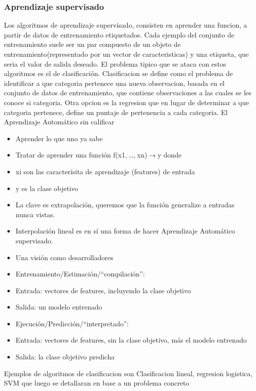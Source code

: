 \documentclass[a4paper,10pt]{article}
\begin{document}
    \subsubsection{Aprendizaje supervisado}
      Los algoritmos de aprendizaje supervisado, consisten en aprender una funcion, a partir de datos de entrenamiento etiquetados. Cada ejemplo del conjunto de entrenamiento suele ser un par
      compuesto de un objeto de entrenamiento(representado por un vector de caracteristicas) y una etiqueta, que seria el valor de salida deseado.
      El problema tipico que se ataca con estos algoritmos es el de clasificación. Clasificacion se define como el problema de identificar a que categoria pertenece una nueva observacion,
      basada en el conjunto de datos de entrenamiento, que contiene observaciones a las cuales se les conoce si categoria.
      Otra opcion es la regresion que en lugar de determinar a que categoria pertenece, define un puntaje de pertenencia a cada categoria.
      El Aprendizaje Automático sin calificar
      \begin{itemize}
	\item Aprender lo que uno ya sabe
	\item Tratar de aprender una función f(x1, …, xn) → y donde
	\item xi son las caracterísita de aprendizaje (features) de entrada
	\item y es la clase objetivo
	\item La clave es extrapolación, queremos que la función generalize a entradas nunca vistas.
	\item Interpolación lineal es en sí una forma de hacer Aprendizaje Automático supervisado.
	\item Una visión como desarrolladores
	\item Entrenamiento/Estimación/“compilación”:
	\item Entrada: vectores de features, incluyendo la clase objetivo
	\item Salida: un modelo entrenado
	\item Ejecución/Predicción/“interpretado”:
	\item Entrada: vectores de features, sin la clase objetivo, más el modelo entrenado
	\item Salida: la clase objetivo predicha
      \end{itemize}

      Ejemplos de algoritmos de clasificacion son Clasificacion lineal, regresion logistica, SVM que luego se detallaran en base a un problema concreto
\end{document}
